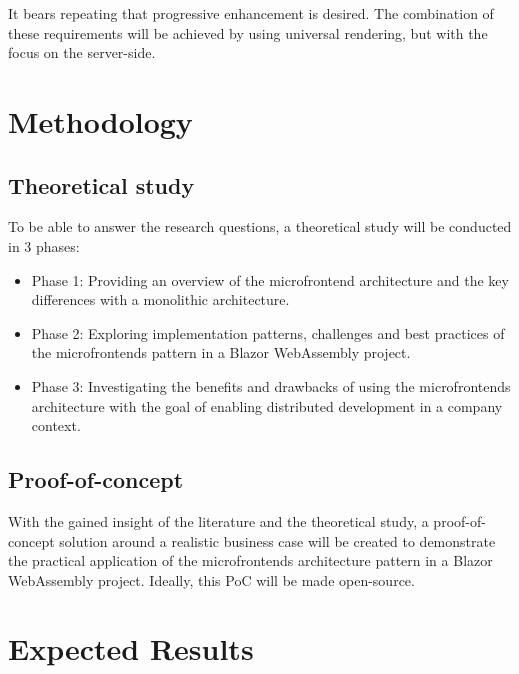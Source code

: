 It bears repeating that progressive enhancement is desired. The combination of
these requirements will be achieved by using universal rendering, but with the
focus on the server-side.





\section{Methodology}
\label{sec:methodology}

\subsection{Theoretical study}
To be able to answer the research questions, a theoretical study will be
conducted in 3 phases:
\begin{itemize}
    \item Phase 1: Providing an overview of the microfrontend architecture and
    the key differences with a monolithic architecture.
    \item Phase 2: Exploring implementation patterns, challenges and best
    practices of the microfrontends pattern in a Blazor WebAssembly project.
    \item Phase 3: Investigating the benefits and drawbacks of using the
    microfrontends architecture with the goal of enabling distributed
    development in a company context.
\end{itemize}

\subsection{Proof-of-concept}
With the gained insight of the literature and the theoretical study, a
proof-of-concept solution around a realistic business case will be created to
demonstrate the practical application of the microfrontends architecture
pattern in a Blazor WebAssembly project. Ideally, this PoC will be made
open-source.




\section{Expected Results}
\label{sec:expected-results}

